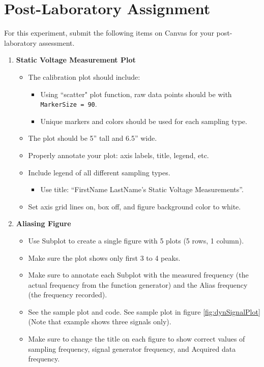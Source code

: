 \documentclass{article} %
\begin{document}
\section{Post-Laboratory Assignment}
For this experiment, submit the following items on Canvas for your post-laboratory assessment. 
\begin{enumerate}
    \item \textbf{Static Voltage Measurement Plot}
    \begin{itemize}
        \item The calibration plot should include:
        \begin{itemize}
            \item Using ``scatter" plot function, raw data points should be with \texttt{MarkerSize = 90}.
            \item Unique markers and colors should be used for each sampling type.
        \end{itemize} 
        \item The plot should be 5'' tall and 6.5'' wide.
        \item Properly annotate your plot: axis labels, title, legend, etc.
        \item Include legend of all different sampling types.
        \begin{itemize}
            \item Use title: ``FirstName LastName's Static Voltage Measurements''.
        \end{itemize}
        \item Set axis grid lines on, box off, and figure background color to white.
    \end{itemize}
    \item \textbf{Aliasing Figure}
    \begin{itemize}
        \item Use Subplot to create a single figure with 5 plots (5 rows, 1 column).
        \item Make sure the plot shows only first 3 to 4 peaks.
        \item Make sure to annotate each Subplot with the measured frequency (the actual frequency from the function generator) and the Alias frequency (the frequency recorded).
        \item See the sample plot and code. See sample plot in figure \ref{fig:dynSignalPlot} (Note that example shows three signals only).
        \item Make sure to change the title on each figure to show correct values of sampling frequency, signal generator frequency, and Acquired data frequency. 

\end{itemize}
\end{enumerate}
\end{document}

